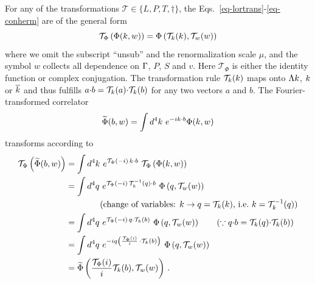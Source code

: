 \begin{widetext}
For any of the transformations $\mathcal{T} \in \{ L, P, T, \dagger \}$, the Eqs.\ \eqref{eq-lortrans}-\eqref{eq-conherm} are of the general form 
\begin{equation}
	\mathcal{T}_\Phi\left(\Phi(k,w)\right) = \Phi\left(\mathcal{T}_k(k),\mathcal{T}_w(w)\right)
\end{equation}
where we omit the subscript ``unsub'' and the renormalization scale $\mu$, and the symbol $w$ collects all dependence on $\Gamma$, $P$, $S$ and $v$. Here $\mathcal{T}_\Phi$ is either the identity function or complex conjugation. The transformation rule $\mathcal{T}_k(k)$ maps onto $\Lambda k$, $k$ or $\overline{k}$ and thus fulfills $a {\cdot} b = \mathcal{T}_k(a) {\cdot} \mathcal{T}_k(b)$ for any two vectors $a$ and $b$. The Fourier-transformed correlator 
\begin{equation}
	\widetilde{\Phi}(\elll,w) =  \int d^4 \kei \ e^{-i \kei \tcdot \elll} \Phi(\kei, w)
\end{equation}
transforms according to
\begin{align}
	\mathcal{T}_\Phi\left(\widetilde{\Phi}(\elll,w) \right) & =  \int d^4 \kei \ e^{\mathcal{T}_\Phi(-i)\, \kei \tcdot \elll}\ \mathcal{T}_\Phi \left( \Phi(\kei, w) \right) \nonumber \\
	& =  \int d^4 q \ e^{\mathcal{T}_\Phi(-i)\, \mathcal{T}^{-1}_\kei(q) \tcdot \elll} \ \Phi\left(q, \mathcal{T}_w( w) \right) \nonumber \\
	& \qquad\qquad \text{(change of variables: $\kei\rightarrow q=\mathcal{T}_\kei(\kei)$, i.e.\ $\kei=\mathcal{T}^{-1}_\kei(q)$)}  \nonumber \\
	& =  \int d^4 q \ e^{\mathcal{T}_\Phi(-i)\, q \tcdot \mathcal{T}_\kei(\elll)} \ \Phi\left(q, \mathcal{T}_w( w) \right) \qquad (\because q \tcdot b = \mathcal{T}_\kei(q) \tcdot \mathcal{T}_\kei(b)) \nonumber \\
    & =  \int d^4 q \ e^{-iq\left(\frac{\mathcal{T}_\Phi(i)}{i}\,  \tcdot \mathcal{T}_\kei(\elll)\right)} \ \Phi\left(q, \mathcal{T}_w( w) \right)\nonumber \\
	& = \widetilde{\Phi}\left( \frac{\mathcal{T}_\Phi(i)}{i} \mathcal{T}_\kei(\elll), \mathcal{T}_w(w) \right)\, .
	\label{eq-phitildetrafo}
\end{align}


\end{widetext}

